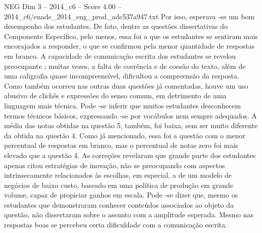 \begin{textsample}{NEG Dim 3 – 2014\_c6 – Score 4.00 – 2014\_c6/enade\_2014\_eng\_prod\_adc537a947.txt}
Por isso, esperava -se um bom desempenho dos estudantes.
De fato, dentre as questões dissertativas do Componente Específico, pelo menos, essa foi a que os estudantes se sentiram mais encorajados a responder, o que se confirmou pela menor quantidade de respostas em branco.
A capacidade de comunicação escrita dos estudantes se revelou preocupante ; muitas vezes, a falta de coerência e de coesão do texto, além de uma caligrafia quase incompreensível, dificultou a compreensão da resposta.
Como também ocorreu nas outras duas questões já comentadas, houve um uso abusivo de clichês e expressões do senso comum, em detrimento de uma linguagem mais técnica.
Pode -se inferir que muitos estudantes desconhecem termos técnicos básicos, expressando -se por vocábulos nem sempre adequados.
A média das notas obtidas na questão 5, também, foi baixa, sem ser muito diferente da obtida na questão 4.
Como já mencionado, essa foi a questão com o menor percentual de respostas em branco, mas o percentual de notas zero foi mais elevado que a questão 4.
As correções revelaram que grande parte dos estudantes apenas citou estratégias de inovação, não se preocupando com aspectos intrinsecamente relacionados às escolhas, em especial, a de um modelo de negócios de baixo custo, baseado em uma política de produção em grande volume, capaz de propiciar ganhos em escala.
Pode -se dizer que, mesmo os estudantes que demonstraram conhecer conteúdos associados ao objeto da questão, não dissertaram sobre o assunto com a amplitude esperada.
Mesmo nas respostas boas se percebeu certa dificuldade com a comunicação escrita.

\end{textsample}
